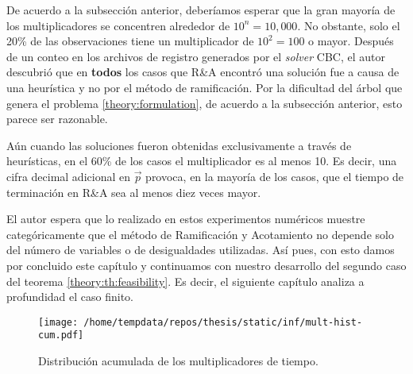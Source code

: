 De acuerdo a la subsección anterior, deberíamos esperar que la gran mayoría de los multiplicadores
se concentren alrededor de $10^{n} = 10{,}000$. No obstante, solo el 20\% de las observaciones tiene un
multiplicador de $10^2 = 100$ o mayor. Después de un conteo en los archivos de registro generados
por el \textit{solver} CBC, el autor descubrió que en \textbf{todos} los casos que R\&A encontró una
solución fue a causa de una heurística y no por el método de ramificación. Por la
dificultad del árbol que genera el problema \eqref{theory:formulation}, de acuerdo a la subsección
anterior, esto parece ser razonable.

Aún cuando las soluciones fueron obtenidas exclusivamente a través de heurísticas, en el 60\% de los
casos el multiplicador es al menos 10. Es decir, una cifra decimal adicional en $\vec{p}$ provoca, en la
mayoría de los casos, que el tiempo de terminación en R\&A sea al menos diez veces mayor.

El autor espera que lo realizado en estos experimentos numéricos muestre categóricamente que el
método de Ramificación y Acotamiento no depende solo del número de variables o de desigualdades
utilizadas. Así pues, con esto damos por concluido este capítulo y continuamos con nuestro
desarrollo del segundo caso del teorema \ref{theory:th:feasibility}. Es decir, el siguiente capítulo
analiza a profundidad el caso finito.

\begin{figure}[hbtp]
	\centering
    \texttt{[image: /home/tempdata/repos/thesis/static/inf/mult-hist-cum.pdf]}
	\caption{Distribución acumulada de los multiplicadores de tiempo.}
	\label{fig:exp:inf:hist}
\end{figure}
